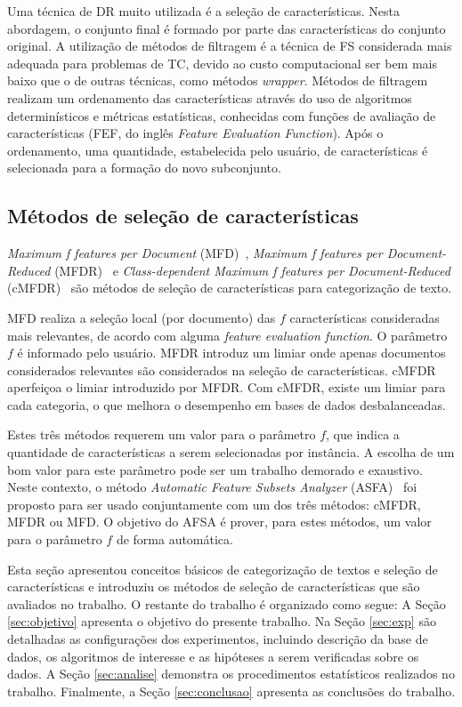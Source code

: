 \documentclass[conference]{IEEEtran}
\begin{document}
Uma técnica de DR muito utilizada é a seleção de características. Nesta abordagem, o conjunto final é formado por parte das características do conjunto original. A utilização de métodos de filtragem é a técnica de FS considerada mais adequada para problemas de TC, devido ao custo computacional ser bem mais baixo que o de outras técnicas, como métodos \emph{wrapper}. Métodos de filtragem realizam um ordenamento das características através do uso de algoritmos determinísticos e métricas estatísticas, conhecidas com funções de avaliação de características (FEF, do inglês \emph{Feature Evaluation Function}). Após o ordenamento, uma quantidade, estabelecida pelo usuário, de características é selecionada para a formação do novo subconjunto.

\subsection{Métodos de seleção de características}
\label{sec:metodos}

\textit{Maximum f features per Document} (MFD)~\cite{mfd2014}, \textit{Maximum f features per Document-Reduced} (MFDR)~\cite{mfd2014} e \textit{Class-dependent Maximum f features per Document-Reduced} (cMFDR)~\cite{fragoso2016cmfdr} são métodos de seleção de características para categorização de texto.

MFD realiza a seleção local (por documento) das $f$ características consideradas mais relevantes, de acordo com alguma \textit{feature evaluation function}. O parâmetro $f$ é informado pelo usuário. MFDR introduz um limiar onde apenas documentos considerados relevantes são considerados na seleção de características. cMFDR aperfeiçoa o limiar introduzido por MFDR. Com cMFDR, existe um limiar para cada categoria, o que melhora o desempenho em bases de dados desbalanceadas.

Estes três métodos requerem um valor para o parâmetro $f$, que indica a quantidade de características a serem selecionadas por instância.
A escolha de um bom valor para este parâmetro pode ser um trabalho demorado e exaustivo.
Neste contexto, o método \textit{Automatic Feature Subsets Analyzer} (ASFA)~\cite{fragoso2016afsa} foi proposto para ser usado conjuntamente com um dos três métodos: cMFDR, MFDR ou MFD.
O objetivo do AFSA é prover, para estes métodos, um valor para o parâmetro $f$ de forma automática.

Esta seção apresentou conceitos básicos de categorização de textos e seleção de características e introduziu os métodos de seleção de características que são avaliados no trabalho. 
O restante do trabalho é organizado como segue: 
A Seção \ref{sec:objetivo} apresenta o objetivo do presente trabalho. 
Na Seção \ref{sec:exp} são detalhadas as configurações dos experimentos, incluindo descrição da base de dados, os algoritmos de interesse e as hipóteses a serem verificadas sobre os dados. 
A Seção \ref{sec:analise} demonstra os procedimentos estatísticos realizados no trabalho.
Finalmente, a Seção \ref{sec:conclusao} apresenta as conclusões do trabalho.
\end{document}
